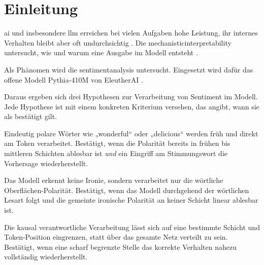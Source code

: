 \section{Einleitung}

\gls{ai} und insbesondere \gls{llm} erreichen bei vielen Aufgaben hohe Leistung, ihr internes Verhalten bleibt aber oft undurchsichtig \cite{vaswani2017attention, radford2018improving}. Die \gls{mechanisticinterpretability} untersucht, wie und warum eine Ausgabe im Modell entsteht \cite{nanda2023comprehensive, elhage2021mathematical}.

Als Phänomen wird die \gls{sentimentanalysis} untersucht.
Eingesetzt wird dafür das offene Modell Pythia-410M von EleutherAI \cite{biderman2023pythia}.

Daraus ergeben sich drei Hypothesen zur Verarbeitung von Sentiment im Modell. Jede Hypothese ist mit einem konkreten Kriterium versehen, das angibt, wann sie als bestätigt gilt.

\begin{description}[style=nextline, leftmargin=0pt, font=\bfseries, itemsep=0.4em]
  \item[H1 (klare Stimmungswörter)] Eindeutig polare Wörter wie „wonderful“ oder „delicious“ werden früh und direkt am Token verarbeitet. Bestätigt, wenn die Polarität bereits in frühen bis mittleren Schichten ablesbar ist \emph{und} ein Eingriff am Stimmungswort die Vorhersage wiederherstellt.
  \item[H2 (Ironie und Sarkasmus)] Das Modell erkennt keine Ironie, sondern verarbeitet nur die wörtliche Oberflächen-Polarität. Bestätigt, wenn das Modell durchgehend der wörtlichen Lesart folgt und die gemeinte ironische Polarität an keiner Schicht linear ablesbar ist.
  \item[H3 (Lokalisierbarkeit)] Die kausal verantwortliche Verarbeitung lässt sich auf eine bestimmte Schicht und Token-Position eingrenzen, statt über das gesamte Netz verteilt zu sein. Bestätigt, wenn eine scharf begrenzte Stelle das korrekte Verhalten nahezu vollständig wiederherstellt.
\end{description}

